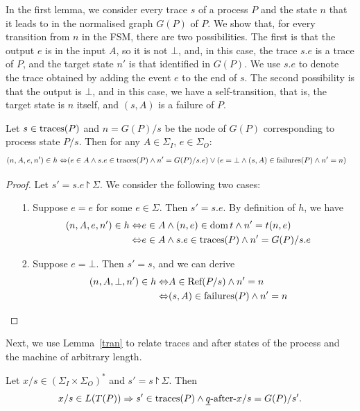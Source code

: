 In the first lemma, we consider every trace $s$ of a process $P$ and the
state $n$ that it leads to in the normalised graph $G(P)$ of $P$. We show
that, for every transition from $n$ in the FSM, there are two possibilities.
The first is that the output $e$ is in the input $A$, so it is not $\bot$,
and, in this case, the trace $s.e$ is a trace of $P$, and the target state
$n'$ is that identified in $G(P)$. We use $s.e$ to denote the trace obtained
by adding the event $e$ to the end of $s$. The second possibility is that the
output is $\bot$, and in this case, we have a self-transition, that is, the
target state is $n$ itself, and $(s,A)$ is a failure of $P$.
%
\begin{lemma}\label{tran}
Let $s\in \text{traces}(P)$ and $n=G(P)/s$ be the node of $G(P)$ corresponding to
process state $P/s$. Then for any $A \in \Sigma_I$, $e\in \Sigma_O\colon$
\begin{align*}
  (n,A,e,n')\in h\Leftrightarrow & (e\in A\wedge s.e\in \text{traces}(P)\wedge n'=G(P)/s.e)\vee(e=\bot \wedge (s,A)\in {\text {\rm failures}}(P)\wedge n'=n)\end{align*}
\end{lemma}
\begin{proof}
  Let $s'=s.e\project \Sigma$.
  We consider the following two cases:
  \begin{itemize}
    \item[1.] Suppose $e=e$ for some $e\in \Sigma$. Then $s'=s.e$. By definition of $h$, we have
    \begin{align*}
      (n,A,e,n')\in h\Leftrightarrow & e\in A\wedge (n,e)\in {\text{\rm dom}}\, t\wedge n'=t(n,e)
      \\
      \Leftrightarrow& e\in A \wedge s.e\in \text{traces}(P)\wedge n'=G(P)/s.e
    \end{align*}
    \item[2.] Suppose $e=\bot$. Then $s'=s$, and we can derive
    \begin{align*}
      (n,A,\bot,n')\in h\Leftrightarrow & A \in {\text {\rm Ref}}(P/s)\wedge n'=n
      \\
      \Leftrightarrow & (s,A) \in {\text {\rm failures}}(P)\wedge n'=n
    \end{align*}
  \end{itemize}
\end{proof}
%
%
Next, we use Lemma~\ref{tran} to relate traces and after states
of the process and the machine of arbitrary length.
%
\begin{lemma}\label{trac}
  Let $x/s \in (\Sigma_I\times\Sigma_O)^*$ and $s' = s\project \Sigma$.
  Then
  $$
    x/s \in L(T(P))\Rightarrow s' \in \text{traces}(P) \wedge \underline q \text{-after-} x/s = G(P)/s'.$$
\end{lemma}

